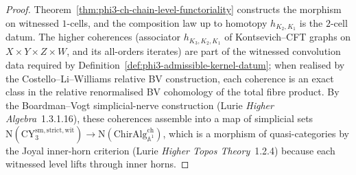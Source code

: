 \begin{proof}
Theorem~\ref{thm:phi3-ch-chain-level-functoriality} constructs the morphism on witnessed $1$-cells, and the composition law up to homotopy $h_{K_2, K_1}$ is the $2$-cell datum. The higher coherences (associator $h_{K_3, K_2, K_1}$ of Kontsevich--CFT graphs on $X \times Y \times Z \times W$, and its all-orders iterates) are part of the witnessed convolution data required by Definition~\ref{def:phi3-admissible-kernel-datum}; when realised by the Costello--Li--Williams relative BV construction, each coherence is an exact class in the relative renormalised BV cohomology of the total fibre product. By the Boardman--Vogt simplicial-nerve construction (Lurie \textit{Higher Algebra}~1.3.1.16), these coherences assemble into a map of simplicial sets $\mathrm{N}(\mathrm{CY}_3^{\mathrm{sm,strict,wit}}) \to \mathrm{N}(\mathrm{ChirAlg}^{\mathrm{ch}}_{\mathbb{A}^1})$, which is a morphism of quasi-categories by the Joyal inner-horn criterion (Lurie \textit{Higher Topos Theory}~1.2.4) because each witnessed level lifts through inner horns.
\end{proof}

